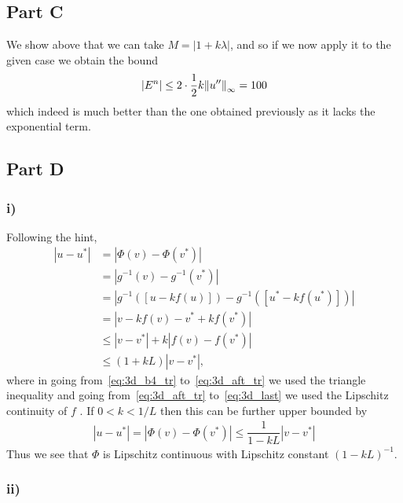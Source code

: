 \documentclass[12pt]{article}
\begin{document}
\subsection*{Part C}
We show above that we can take $M = |1+k\lambda|$, and so if we now apply it to the given case we obtain the bound
\begin{align}
    |E^{n}| \le 2\cdot \dfrac{1}{2}k\norm{u^{\prime\prime}}_{\infty} = 100
\end{align}
which indeed is much better than the one obtained previously as it lacks the exponential term. 

\subsection*{Part D}

\subsubsection*{i)}
Following the hint, 
\begin{subequations}
    \begin{align}
        |u-u^{*}| &= |\Phi(v) - \Phi(v^{*})|\\
        &= |g^{-1}(v) - g^{-1}(v^{*})|\\
        &= |g^{-1}\left(\left[u-kf(u)\right]\right) - g^{-1}\left(\left[u^{*}-kf(u^{*})\right]\right)|\\
        &= |v-kf(v) - v^{*} + kf(v^{*})|\label{eq:3d_b4_tr}\\
        &\le |v-v^{*}| + k|f(v)-f(v^{*})|\label{eq:3d_aft_tr}\\
        &\le (1+kL) |v-v^{*}|\label{eq:3d_last},
    \end{align}
\end{subequations}
where in going from~\eqref{eq:3d_b4_tr} to~\eqref{eq:3d_aft_tr} we used the triangle inequality and going from~\eqref{eq:3d_aft_tr} to~\eqref{eq:3d_last} we used the Lipschitz continuity of $f$ . If $0<k<1/L$ then this can be further upper bounded by
\begin{align}
    |u-u^{*}|= |\Phi(v) - \Phi(v^{*})| \le \dfrac{1}{1-kL}|v-v^{*}|
\end{align}
Thus we see that $\Phi$ is Lipschitz continuous with Lipschitz constant $(1-kL)^{-1}$.

\subsubsection*{ii)}
\end{document}
